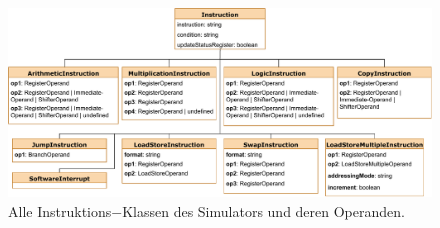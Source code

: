\documentclass[a4paper, 11pt, onecolumn]{article}
\begin{document}
\begin{figure}[!htb]
\centering
\includegraphics[width=1\textwidth]{data/instructions}
\caption[Klassendiagramm der Instruktionen]{Alle Instruktions$-$Klassen des Simulators und deren Operanden.}
\label{fig:instructions}
\end{figure}
\end{document}
